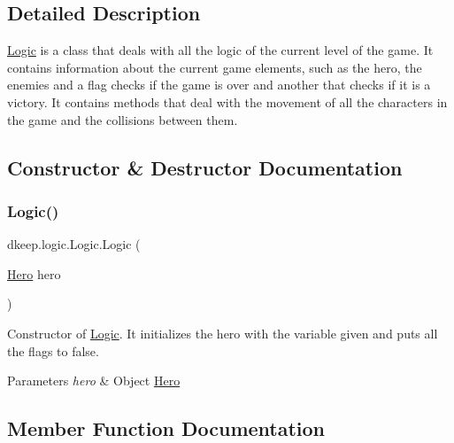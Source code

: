 \subsection{Detailed Description}
\hyperlink{classdkeep_1_1logic_1_1_logic}{Logic} is a class that deals with all the logic of the current level of the game. It contains information about the current game elements, such as the hero, the enemies and a flag checks if the game is over and another that checks if it is a victory. It contains methods that deal with the movement of all the characters in the game and the collisions between them. 

\subsection{Constructor \& Destructor Documentation}
\mbox{\label{classdkeep_1_1logic_1_1_logic_a3e2a7548a462e06de5852e39df402b48}} 
\subsubsection{\texorpdfstring{Logic()}{Logic()}}
{\footnotesize\ttfamily dkeep.\+logic.\+Logic.\+Logic (\begin{DoxyParamCaption}\item[{\hyperlink{classdkeep_1_1logic_1_1_hero}{Hero}}]{hero }\end{DoxyParamCaption})}

Constructor of \hyperlink{classdkeep_1_1logic_1_1_logic}{Logic}. It initializes the hero with the variable given and puts all the flags to false. 
\begin{DoxyParams}{Parameters}
{\em hero} & Object \hyperlink{classdkeep_1_1logic_1_1_hero}{Hero} \\
\hline
\end{DoxyParams}


\subsection{Member Function Documentation}
\mbox{\label{classdkeep_1_1logic_1_1_logic_ad52a9235db954ca4014550582c94aa50}} 

